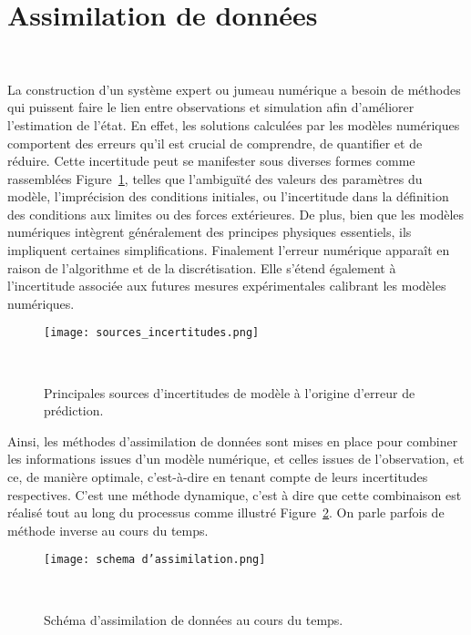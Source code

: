 
\section{Assimilation de données}~\label{sec:da}

La construction d'un système expert ou jumeau numérique a besoin de méthodes qui puissent faire le lien entre observations et simulation afin d'améliorer l'estimation de l'état. En effet, les solutions calculées par les modèles numériques comportent des erreurs qu'il est crucial de comprendre, de quantifier et de réduire. Cette incertitude peut se manifester sous diverses formes comme rassemblées Figure~\ref{fig:sources_erreur}, telles que l'ambiguïté des valeurs des paramètres du modèle, l'imprécision des conditions initiales, ou l'incertitude dans la définition des conditions aux limites ou des forces extérieures. De plus, bien que les modèles numériques intègrent généralement des principes physiques essentiels, ils impliquent certaines simplifications. Finalement l'erreur numérique apparaît en raison de l'algorithme et de la discrétisation. Elle s'étend également à l'incertitude associée aux futures mesures expérimentales calibrant les modèles numériques.

\begin{figure}[h]
    \centering
    \texttt{[image: sources\_incertitudes.png]}
    \caption{Principales sources d'incertitudes de modèle à l'origine d'erreur de prédiction.}~\label{fig:sources_erreur}
\end{figure}

Ainsi, les méthodes d'assimilation de données sont mises en place pour combiner les informations issues d'un modèle numérique, et celles issues de l'observation, et ce, de manière optimale, c'est-à-dire en tenant compte de leurs incertitudes respectives. C'est une méthode dynamique, c'est à dire que cette combinaison est réalisé tout au long du processus comme illustré Figure~\ref{fig:assim_da_scheme}. On parle parfois de méthode inverse au cours du temps.

\begin{figure}[h]
    \centering
    \texttt{[image: schema d'assimilation.png]}
    \caption{Schéma d'assimilation de données au cours du temps.}~\label{fig:assim_da_scheme}
\end{figure}


